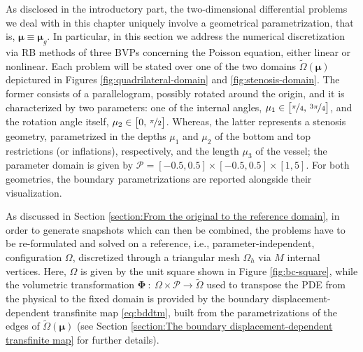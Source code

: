 \documentclass[12pt, a4paper, twoside, openright]{report}
\numberwithin{equation}{chapter}
\theoremstyle{theorem}
\theoremstyle{definition}
\theoremstyle{remark}
\theoremstyle{proposition}
\numberwithin{figure}{chapter}
\newcommand{\wt}[1]{\widetilde{#1}}
\newcommand{\bg}[1]{\boldsymbol{#1}}
\begin{document}
		As disclosed in the introductory part, the two-dimensional differential problems we deal with in this chapter uniquely involve a geometrical parametrization, that is, $\bg{\mu} \equiv \bg{\mu}_g$. In particular, in this section we address the numerical discretization via RB methods of three BVPs concerning the Poisson equation, either linear or nonlinear. Each problem will be stated over one of the two domains $\wt{\Omega}(\bg{\mu})$ depictured in Figures \ref{fig:quadrilateral-domain} and \ref{fig:stenosis-domain}. The former consists of a parallelogram, possibly rotated around the origin, and it is characterized by two parameters: one of the internal angles, $\mu_1 \in \big[ \nicefrac{\pi}{4}, \, \nicefrac{3 \pi}{4} \big]$, and the rotation angle itself, $\mu_2 \in \big[ 0, \, \nicefrac{\pi}{2} \big]$. Whereas, the latter represents a stenosis geometry, parametrized in the depths $\mu_1$ and $\mu_2$ of the bottom and top restrictions (or inflations), respectively, and the length $\mu_3$ of the vessel; the parameter domain is given by $\mathcal{P} = [-0.5,0.5] \times [-0.5,0.5] \times [1,5]$. For both geometries, the boundary parametrizations are reported alongside their visualization.
		
		As discussed in Section \ref{section:From the original to the reference domain}, in order to generate snapshots which can then be combined, the problems have to be re-formulated and solved on a reference, i.e., parameter-independent, configuration $\Omega$, discretized through a triangular mesh $\Omega_h$ via $M$ internal vertices. Here, $\Omega$ is given by the unit square shown in Figure \ref{fig:bc-square}, while the volumetric transformation $\bg{\Phi} ~ : ~ \Omega \times \mathcal{P} \rightarrow \wt{\Omega}$ used to transpose the PDE from the physical to the fixed domain is provided by the boundary displacement-dependent transfinite map \eqref{eq:bddtm}, built from the parametrizations of the edges of $\wt{\Omega}(\bg{\mu})$ (see Section \ref{section:The boundary displacement-dependent transfinite map} for further details).
		
\end{document}
